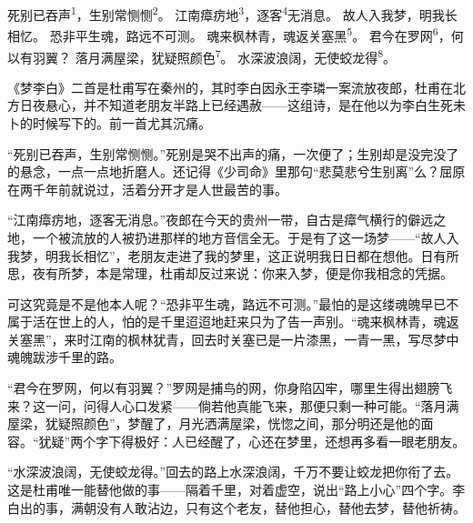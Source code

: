 
\begin{poem}
死别已吞声\textsuperscript{1}，生别常恻恻\textsuperscript{2}。
江南瘴疠地\textsuperscript{3}，逐客\textsuperscript{4}无消息。
故人入我梦，明我长相忆。
恐非平生魂，路远不可测。
魂来枫林青，魂返关塞黑\textsuperscript{5}。
君今在罗网\textsuperscript{6}，何以有羽翼？
落月满屋梁，犹疑照颜色\textsuperscript{7}。
水深波浪阔，无使蛟龙得\textsuperscript{8}。
\end{poem}

\begin{annotations}
\end{annotations}

\begin{appreciation}
《梦李白》二首是杜甫写在秦州的，其时李白因永王李璘一案流放夜郎，杜甫在北方日夜悬心，并不知道老朋友半路上已经遇赦——这组诗，是在他以为李白生死未卜的时候写下的。前一首尤其沉痛。

“死别已吞声，生别常恻恻。”死别是哭不出声的痛，一次便了；生别却是没完没了的悬念，一点一点地折磨人。还记得《少司命》里那句“悲莫悲兮生别离”么？屈原在两千年前就说过，活着分开才是人世最苦的事。

“江南瘴疠地，逐客无消息。”夜郎在今天的贵州一带，自古是瘴气横行的僻远之地，一个被流放的人被扔进那样的地方音信全无。于是有了这一场梦——“故人入我梦，明我长相忆”，老朋友走进了我的梦里，这正说明我日日都在想他。日有所思，夜有所梦，本是常理，杜甫却反过来说：你来入梦，便是你我相念的凭据。

可这究竟是不是他本人呢？“恐非平生魂，路远不可测。”最怕的是这缕魂魄早已不属于活在世上的人，怕的是千里迢迢地赶来只为了告一声别。“魂来枫林青，魂返关塞黑”，来时江南的枫林犹青，回去时关塞已是一片漆黑，一青一黑，写尽梦中魂魄跋涉千里的路。

“君今在罗网，何以有羽翼？”罗网是捕鸟的网，你身陷囚牢，哪里生得出翅膀飞来？这一问，问得人心口发紧——倘若他真能飞来，那便只剩一种可能。“落月满屋梁，犹疑照颜色”，梦醒了，月光洒满屋梁，恍惚之间，那分明还是他的面容。“犹疑”两个字下得极好：人已经醒了，心还在梦里，还想再多看一眼老朋友。

“水深波浪阔，无使蛟龙得。”回去的路上水深浪阔，千万不要让蛟龙把你衔了去。这是杜甫唯一能替他做的事——隔着千里，对着虚空，说出“路上小心”四个字。李白出的事，满朝没有人敢沾边，只有这个老友，替他担心，替他去梦，替他祈祷。
\end{appreciation}
